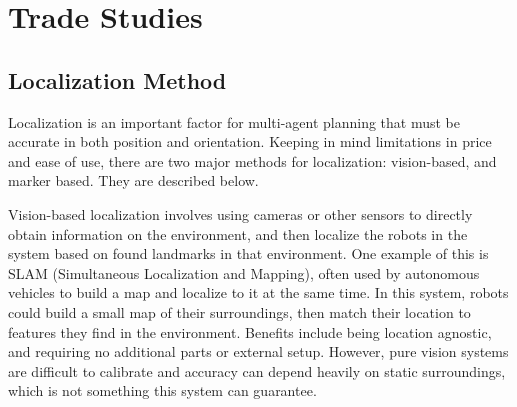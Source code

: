 
\section{Trade Studies}
\label{sec:trade_studies}



\subsection{Localization Method}
Localization is an important factor for multi-agent planning that must be accurate in both position and orientation. Keeping in mind limitations in price and ease of use, there are two major methods for localization: vision-based, and marker based. They are described below.

Vision-based localization involves using cameras or other sensors to directly obtain information on the environment, and then localize the robots in the system based on found landmarks in that environment. One example of this is SLAM (Simultaneous Localization and Mapping), often used by autonomous vehicles to build a map and localize to it at the same time. In this system, robots could build a small map of their surroundings, then match their location to features they find in the environment. Benefits include being location agnostic, and requiring no additional parts or external setup. However, pure vision systems are difficult to calibrate and accuracy can depend heavily on static surroundings, which is not something this system can guarantee.

